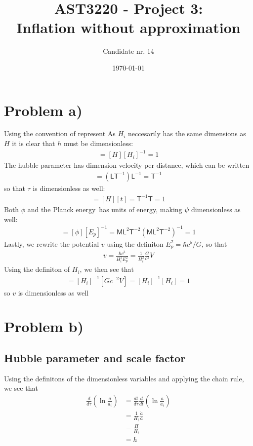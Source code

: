 \documentclass[reprint,english,notitlepage]{revtex4-1}  %
\numberwithin{equation}{section}
\newcommand{\TT}{\textsf{T}}
\newcommand{\LL}{\textsf{L}}
\newcommand{\MM}{\textsf{M}}
\begin{document}
\title{AST3220 - Project 3: \\ Inflation without approximation}   %
\author{Candidate nr. 14}
\date{\today}                             %
\noaffiliation                            %
\maketitle                                %

\section{Problem a)}
Using the convention of represent
As $H_i$ neccesarily has the same dimensions as $H$ it is clear that $h$ must
be dimensionless:
\begin{align}
	[h] = [H] [H_i]^{-1} = 1
\end{align}
The hubble parameter has dimension velocity per distance, which can be written
\begin{align}
	[H] = (\LL \TT^{-1}) \LL^{-1} = \TT^{-1}
\end{align}
so that $\tau$ is dimensionless as well:
\begin{align}
  [\tau] = [H] [t] = \TT^{-1} \TT = 1
\end{align}
Both $\phi$ and the Planck energy has units of energy, making $\psi$ dimensionless
as well:
\begin{align}
	[\psi] = [\phi] [E_p]^{-1} = \MM \LL^2 \TT^{-2} (\MM \LL^2 \TT^{-2})^{-1} = 1
\end{align}
Lastly, we rewrite the potential $v$ using the definiton $E_p^2 = \hbar c^5/G$,
so that
\begin{align}
	v = \frac{\hbar c^3}{H_i^2 E_p^2} = \frac{1}{H_i^2} \frac{G}{c^2}V
\end{align}
Using the definiton of $H_i$, we then see that
\begin{align}
	[v] = [H_i]^{-1} [G c^{-2} V] = [H_i]^{-1}[H_i] = 1
\end{align}
so $v$ is dimensionless as well

\section{Problem b)}
\subsection{Hubble parameter and scale factor}
Using the definitons of the dimensionless variables and applying the chain rule,
we see that
\begin{align}
	\frac{d}{d\tau}\left(\ln \frac{a}{a_i}\right)
				&= \frac{dt}{d\tau}\frac{d}{dt}\left(\ln \frac{a}{a_i}\right) \\
				&= \frac{1}{H_i} \frac{\dot{a}}{a} \\
				&= \frac{H}{H_i} \\
				&= h
\end{align}
\end{document}
